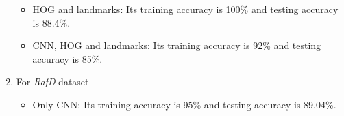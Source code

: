 \begin{enumerate}
\begin{itemize}[noitemsep,nolistsep]

    \item HOG and landmarks: Its training accuracy is 100\% and testing accuracy is 88.4\%.
    \item CNN, HOG and landmarks: Its training accuracy is 92\% and testing accuracy is 85\%.
\end{itemize}
\item For \textit{RafD} dataset \newline
\begin{itemize}[noitemsep,nolistsep]
    \item Only CNN: Its training accuracy is 95\% and testing accuracy is 89.04\%.

\end{itemize}
\end{enumerate}
